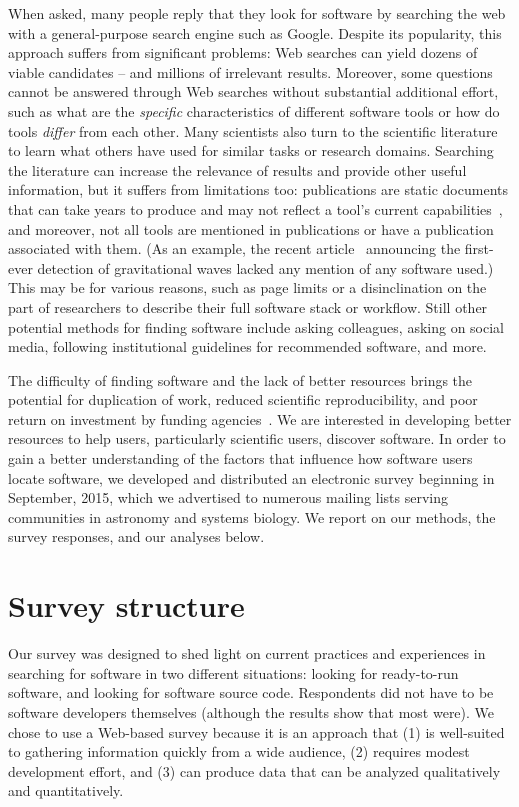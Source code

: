 \documentclass{casicswhitepaper}
\begin{document}
When asked, many people reply that they look for software by searching the web with a general-purpose search engine such as Google.  Despite its popularity, this approach suffers from significant problems: Web searches can yield dozens of viable candidates -- and millions of irrelevant results.  Moreover, some questions cannot be answered through Web searches without substantial additional effort, such as what are the \emph{specific} characteristics of different software tools or how do tools \emph{differ} from each other.  Many scientists also turn to the scientific literature to learn what others have used for similar tasks or research domains.  Searching the literature can increase the relevance of results and provide other useful information, but it suffers from limitations too: publications are static documents that can take years to produce and may not reflect a tool's current capabilities~\cite{wren_2004}, and moreover, not all tools are mentioned in publications or have a publication associated with them.  (As an example, the recent article~\cite{abbott2016observation} announcing the first-ever detection of gravitational waves lacked any mention of any software used.)  This may be for various reasons, such as page limits or a disinclination on the part of researchers to describe their full software stack or workflow.  Still other potential methods for finding software include asking colleagues, asking on social media, following institutional guidelines for recommended software, and more.

The difficulty of finding software and the lack of better resources brings the potential for duplication of work, reduced scientific reproducibility, and poor return on investment by funding agencies~\citep{cannata_2005}.  We are interested in developing better resources to help users, particularly scientific users, discover software.  In order to gain a better understanding of the factors that influence how software users locate software, we developed and distributed an electronic survey beginning in September, 2015, which we advertised to numerous mailing lists serving communities in astronomy and systems biology.  We report on our methods, the survey responses, and our analyses below.


\section{Survey structure}

Our survey was designed to shed light on current practices and experiences in searching for software in two different situations: looking for ready-to-run software, and looking for software source code.  Respondents did not have to be software developers themselves (although the results show that most were).  We chose to use a Web-based survey because it is an approach that (1) is well-suited to gathering information quickly from a wide audience, (2) requires modest development effort, and (3) can produce data that can be analyzed qualitatively and quantitatively.
\end{document}
